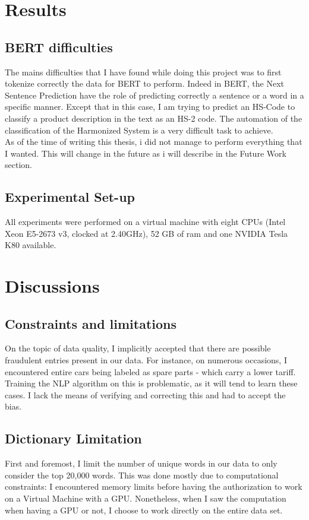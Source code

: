 \chapter{Results}
\section{BERT difficulties}

The mains difficulties that I have found while doing this project was to first tokenize correctly the data for BERT to perform. Indeed in BERT, the Next Sentence Prediction have the role of predicting correctly a sentence or a word in a specific manner. Except that in this case, I am trying to predict an HS-Code to classify a product description in the text as an HS-2 code. The automation of the classification of the Harmonized System is a very difficult task to achieve.\\

As of the time of writing this thesis, i did not manage to perform everything that I wanted. This will change in the future as i will describe in the Future Work section.

\section{Experimental Set-up}
All experiments were performed on a virtual machine with eight CPUs (Intel Xeon E5-2673 v3, clocked at 2.40GHz), 52 GB of ram and one NVIDIA Tesla K80 available. 


\chapter{Discussions}
\section{Constraints and limitations}
On the topic of data quality, I implicitly accepted that there are possible fraudulent entries present in our data. For instance, on numerous occasions, I encountered entire cars being labeled as spare parts - which carry a lower tariff. Training the NLP algorithm on this is problematic, as it will tend to learn these cases. I lack the means of verifying and correcting this and had to accept the bias.

\section{Dictionary Limitation}
First and foremost, I limit the number of unique words in our data to only consider the top 20,000 words. This was done mostly due to computational constraints: I encountered memory limits before having the authorization to work on a Virtual Machine with a GPU. Nonetheless, when I saw the computation when having a GPU or not, I choose to work directly on the entire data set.